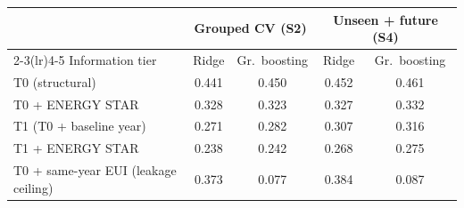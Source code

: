\begin{tabular}{lcccc}
\toprule
 & \multicolumn{2}{c}{Grouped CV (S2)} & \multicolumn{2}{c}{Unseen + future (S4)} \\
\cmidrule(lr){2-3}\cmidrule(lr){4-5}
Information tier & Ridge & Gr.\ boosting & Ridge & Gr.\ boosting \\
\midrule
T0 (structural) & 0.441 & 0.450 & 0.452 & 0.461 \\
T0 + ENERGY STAR & 0.328 & 0.323 & 0.327 & 0.332 \\
T1 (T0 + baseline year) & 0.271 & 0.282 & 0.307 & 0.316 \\
T1 + ENERGY STAR & 0.238 & 0.242 & 0.268 & 0.275 \\
T0 + same-year EUI (leakage ceiling) & 0.373 & 0.077 & 0.384 & 0.087 \\
\bottomrule
\end{tabular}
